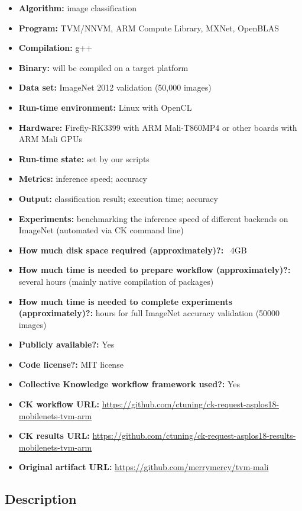 \documentclass[sigplan]{acmart}
\begin{document}
{\small
\begin{itemize}
  \item {\bf Algorithm:} image classification
  \item {\bf Program:} TVM/NNVM, ARM Compute Library, MXNet, OpenBLAS
  \item {\bf Compilation:} g++
  \item {\bf Binary:} will be compiled on a target platform
  \item {\bf Data set:} ImageNet 2012 validation (50,000 images)
  \item {\bf Run-time environment:} Linux with OpenCL
  \item {\bf Hardware:} Firefly-RK3399 with ARM Mali-T860MP4 or other boards with ARM Mali GPUs
  \item {\bf Run-time state:} set by our scripts
  \item {\bf Metrics:} inference speed; accuracy
  \item {\bf Output:} classification result; execution time; accuracy
  \item {\bf Experiments:} benchmarking the inference speed of different backends on ImageNet (automated via CK command line)
  \item {\bf How much disk space required (approximately)?:} ~4GB
  \item {\bf How much time is needed to prepare workflow (approximately)?:} several hours (mainly native compilation of packages)
  \item {\bf How much time is needed to complete experiments (approximately)?:} hours for full ImageNet accuracy validation (50000 images)
  \item {\bf Publicly available?:} Yes
  \item {\bf Code license?:} MIT license
  \item {\bf Collective Knowledge workflow framework used?:} Yes
  \item {\bf CK workflow URL:} \url{https://github.com/ctuning/ck-request-asplos18-mobilenets-tvm-arm }
  \item {\bf CK results URL:} \url{https://github.com/ctuning/ck-request-asplos18-results-mobilenets-tvm-arm}
  \item {\bf Original artifact URL:} \url{https://github.com/merrymercy/tvm-mali}
\end{itemize}

\subsection{Description}

}
\end{document}
